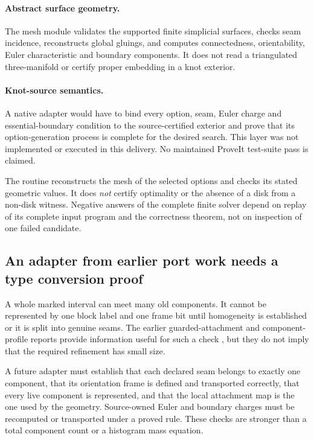 \documentclass[11pt,letterpaper]{article}
\theoremstyle{definition}
\begin{document}
\paragraph{Abstract surface geometry.} The mesh module validates the supported finite simplicial surfaces, checks seam incidence, reconstructs global gluings, and computes connectedness, orientability, Euler characteristic and boundary components. It does not read a triangulated three-manifold or certify proper embedding in a knot exterior.

\paragraph{Knot-source semantics.} A native adapter would have to bind every option, seam, Euler charge and essential-boundary condition to the source-certified exterior and prove that its option-generation process is complete for the desired search. This layer was not implemented or executed in this delivery. No maintained ProveIt test-suite pass is claimed.

The routine  reconstructs the mesh of the selected options and checks its stated geometric values. It does \emph{not} certify optimality or the absence of a disk from a non-disk witness. Negative answers of the complete finite solver depend on replay of its complete input program and the correctness theorem, not on inspection of one failed candidate.

\subsection{An adapter from earlier port work needs a type conversion proof}
A whole marked interval can meet many old components. It cannot be represented by one block label and one frame bit until homogeneity is established or it is split into genuine seams. The earlier guarded-attachment and component-profile reports provide information useful for such a check \cite{ports,compiled}, but they do not imply that the required refinement has small size.

A future adapter must establish that each declared seam belongs to exactly one component, that its orientation frame is defined and transported correctly, that every live component is represented, and that the local attachment map is the one used by the geometry. Source-owned Euler and boundary charges must be recomputed or transported under a proved rule. These checks are stronger than a total component count or a histogram mass equation.
\end{document}
